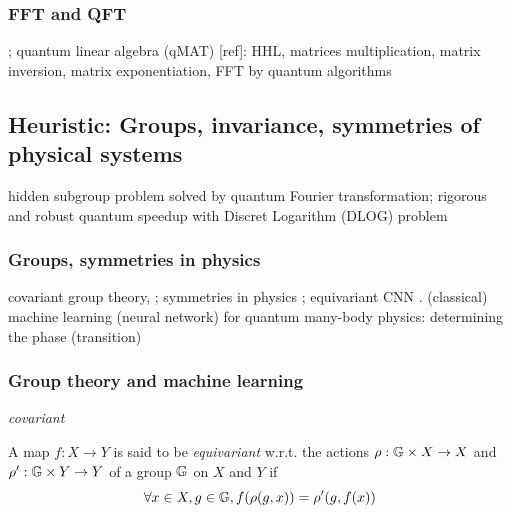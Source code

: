 \subsubsection{FFT and QFT}
\cite{kondorGraphletSpectrum2009};
quantum linear algebra (qMAT) [ref]: HHL, matrices multiplication, matrix inversion, matrix exponentiation, FFT by quantum algorithms
\cite{sornsaengQuantumDiffusionMap2021}

\subsection{Heuristic: Groups, invariance, symmetries of physical systems}
hidden subgroup problem solved by quantum Fourier transformation\cite{childsQuantumAlgorithmsAlgebraic2010};
rigorous and robust quantum speedup with Discret Logarithm (DLOG) problem \cite{liuRigorousRobustQuantum2021}

\subsubsection{Groups, symmetries in physics}
covariant 
\cite{glickCovariantQuantumKernels2021}
group theory, 
\cite{kondorGroupTheoreticalMethods2008};
symmetries in physics
\cite{bogatskiyLorentzGroupEquivariant2020}
\cite{bogatskiySymmetryGroupEquivariant2022};
equivariant CNN 
\cite{zhengSpeedingLearningQuantum2022}.
(classical) machine learning (neural network) for quantum many-body physics:
determining the phase (transition) \cite{carrasquillaMachineLearningPhases2017}
\cite{carleoSolvingQuantumManyBody2017}

\subsubsection{Group theory and machine learning}
\begin{definition}[Covariant]\label{def:covariant}
	\emph{covariant}
\end{definition}
\begin{definition}[Equivariance]\label{def:equivariant}
	A map $f: X\to Y$ is said to be \emph{equivariant} w.r.t.
	the actions $\rho: \mathbb{G} \times X\to X$ and $\rho': \mathbb{G} \times Y\to Y$ of a group $\mathbb{G}$ on $X$ and $Y$ if
	\begin{equation}
		\forall x\in X, g\in \mathbb{G},
		f(\rho(g,x)) = \rho'(g,f(x))
	\end{equation}
\end{definition}


